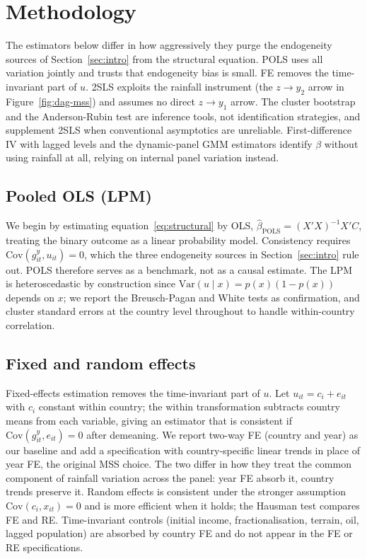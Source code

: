 \documentclass[11pt,a4paper]{article}
\begin{document}
\section{Methodology}\label{sec:methods}
The estimators below differ in how aggressively they purge the
endogeneity sources of Section~\ref{sec:intro} from the structural
equation. POLS uses all variation jointly and trusts that endogeneity
bias is small. FE removes the time-invariant part of $u$. 2SLS exploits
the rainfall instrument (the $z \to y_2$ arrow in
Figure~\ref{fig:dag-mss}) and assumes no direct $z \to y_1$ arrow. The
cluster bootstrap and the Anderson-Rubin test are inference tools, not
identification strategies, and supplement 2SLS when conventional
asymptotics are unreliable. First-difference IV with lagged levels and
the dynamic-panel GMM estimators identify $\beta$ without using
rainfall at all, relying on internal panel variation instead.

\subsection{Pooled OLS (LPM)}\label{sec:pols}

We begin by estimating equation~\eqref{eq:structural} by OLS,
$\hat\beta_{\text{POLS}} = (X'X)^{-1} X' C$, treating the binary
outcome as a linear probability model. Consistency requires
$\mathrm{Cov}(g^{y}_{it}, u_{it}) = 0$, which the three endogeneity
sources in Section~\ref{sec:intro} rule out. POLS therefore serves as
a benchmark, not as a causal estimate. The LPM is heteroscedastic by
construction since $\mathrm{Var}(u \mid x) = p(x)(1-p(x))$ depends on
$x$; we report the Breusch-Pagan and White tests as confirmation, and
cluster standard errors at the country level throughout to handle
within-country correlation.

\subsection{Fixed and random effects}\label{sec:fe}

Fixed-effects estimation removes the time-invariant part of $u$. Let
$u_{it} = c_i + e_{it}$ with $c_i$ constant within country; the within
transformation subtracts country means from each variable, giving an
estimator that is consistent if $\mathrm{Cov}(g^{y}_{it}, e_{it}) = 0$
after demeaning. We report two-way FE (country and year) as our
baseline and add a specification with country-specific linear trends
in place of year FE, the original MSS choice. The two differ in how
they treat the common component of rainfall variation across the
panel: year FE absorb it, country trends preserve it. Random effects
is consistent under the stronger assumption $\mathrm{Cov}(c_i, x_{it})
= 0$ and is more efficient when it holds; the Hausman test compares
FE and RE. Time-invariant controls (initial income, fractionalisation,
terrain, oil, lagged population) are absorbed by country FE and do
not appear in the FE or RE specifications.
\end{document}
